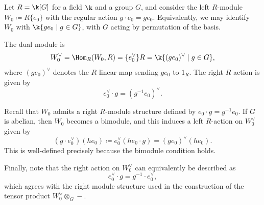 \begin{example}\label{BimoduleW}
Let $R = \k[G]$ for a field $\k$ and a group $G$, and consider the left $R$-module $W_0 \coloneqq R\{e_0\}$ with the regular action $g \cdot e_0 = ge_0$. Equivalently, we may identify $W_0$ with $\k\{ge_0 \mid g \in G\}$, with $G$ acting by permutation of the basis.

The dual module is
\[
W_0^\vee = \Hom_R(W_0,R) = \{e_0^\vee\}R = \k\{(ge_0)^\vee \mid g \in G\},
\]
where $(ge_0)^\vee$ denotes the $R$-linear map sending $ge_0$ to $1_R$. The right $R$-action is given by
\[
e_0^\vee \cdot g = (g^{-1} e_0)^\vee.
\]

Recall that $W_0$ admits a right $R$-module structure defined by $e_0 \cdot g = g^{-1} e_0$. If $G$ is abelian, then $W_0$ becomes a bimodule, and this induces a left $R$-action on $W_0^\vee$ given by
\[
(g \cdot e_0^\vee)(he_0) \coloneqq e_0^\vee(he_0 \cdot g)= (ge_0)^\vee(he_0).
\]
This is well-defined precisely because the bimodule condition holds.

Finally, note that the right action on $W_0^\vee$ can equivalently be described as
\[
e_0^\vee \cdot g = g^{-1} \cdot e_0^\vee,
\]
which agrees with the right module structure used in the construction of the tensor product $W_0^\vee \otimes_G -$.
\end{example}

